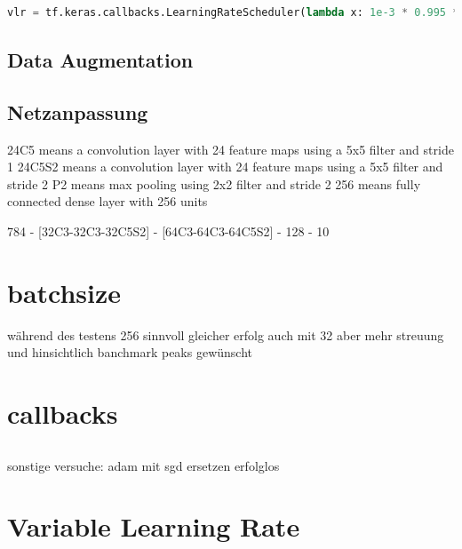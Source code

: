 \documentclass[
fontsize=12pt,					%
paper=a4,						%
twoside=true, 					%
listof=totoc, 					%
bibliography=totoc,				%
titlepage, 						%
headsepline, 					%
DIV=12,							%
BCOR=6mm,						%
cleardoublepage=empty,			%
parskip,							%
ngerman
]{scrartcl}
\begin{document}
\begin{lstlisting}[language=Python, caption=Variable Learning-Rate, label=vlr]
	vlr = tf.keras.callbacks.LearningRateScheduler(lambda x: 1e-3 * 0.995 ** x)
\end{lstlisting}

\subsection{Data Augmentation}

%


\subsection{Netzanpassung}

24C5 means a convolution layer with 24 feature maps using a 5x5 filter and stride 1
24C5S2 means a convolution layer with 24 feature maps using a 5x5 filter and stride 2
P2 means max pooling using 2x2 filter and stride 2
256 means fully connected dense layer with 256 units

784 - [32C3-32C3-32C5S2] - [64C3-64C3-64C5S2] - 128 - 10

\section{batchsize }

während des testens 256 sinnvoll
gleicher erfolg auch mit 32 aber mehr streuung und hinsichtlich banchmark peaks gewünscht

\section{callbacks}



\subsection{}

sonstige versuche: adam mit sgd ersetzen erfolglos


\section{Variable Learning Rate}
\end{document}
